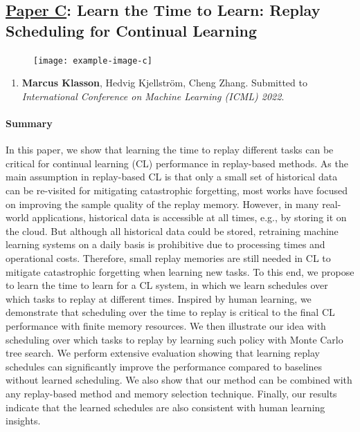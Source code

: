 \subsection{\underline{Paper C}: Learn the Time to Learn: Replay Scheduling for Continual Learning}
\label{sec:paperC}

\begin{figure}[h]
	\centering 
	\texttt{[image: example-image-c]}
	\caption{ }
	\label{fig:paperC}
\end{figure}

\begin{enumerate}
	\item[] \textbf{Marcus Klasson}, Hedvig Kjellström, Cheng Zhang. Submitted to \textit{International Conference on Machine Learning (ICML) 2022}.
\end{enumerate}

\paragraph{Summary}
In this paper, we show that learning the time to replay different tasks can be critical for continual learning (CL) performance in replay-based methods. As the main assumption in replay-based CL is that only a small set of historical data can be re-visited for mitigating catastrophic forgetting, most works have focused on improving the sample quality of the replay memory. However, in many real-world applications, historical data is accessible at all times, e.g., by storing it on the cloud. But although all historical data could be stored, retraining machine learning systems on a daily basis is prohibitive due to processing times and operational costs. Therefore, small replay memories are still needed in CL to mitigate catastrophic forgetting when learning new tasks. To this end, we propose to learn the time to learn for a CL system, in which we learn schedules over which tasks to replay at different times. Inspired by human learning, we demonstrate that scheduling over the time to replay is critical to the final CL performance with finite memory resources. We then illustrate our idea with scheduling over which tasks to replay by learning such policy with Monte Carlo tree search. We perform extensive evaluation showing that learning replay schedules can significantly improve the performance compared to baselines without learned scheduling. We also show that our method can be combined with any replay-based method and memory selection technique. Finally, our results indicate that the learned schedules are also consistent with human learning insights.



